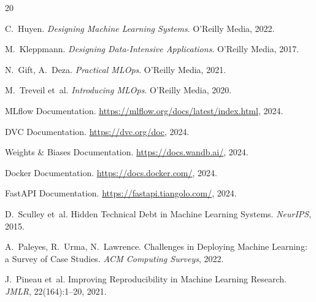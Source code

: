 \documentclass[12pt,a4paper,twoside]{book}
\theoremstyle{definition}
\theoremstyle{plain}
\theoremstyle{remark}
\begin{document}

\begin{thebibliography}{20}

C.~Huyen.
\newblock \emph{Designing Machine Learning Systems}.
\newblock O'Reilly Media, 2022.

M.~Kleppmann.
\newblock \emph{Designing Data-Intensive Applications}.
\newblock O'Reilly Media, 2017.

N.~Gift, A.~Deza.
\newblock \emph{Practical MLOps}.
\newblock O'Reilly Media, 2021.

M.~Treveil et~al.
\newblock \emph{Introducing MLOps}.
\newblock O'Reilly Media, 2020.

MLflow Documentation.
\newblock \url{https://mlflow.org/docs/latest/index.html}, 2024.

DVC Documentation.
\newblock \url{https://dvc.org/doc}, 2024.

Weights \& Biases Documentation.
\newblock \url{https://docs.wandb.ai/}, 2024.

Docker Documentation.
\newblock \url{https://docs.docker.com/}, 2024.

FastAPI Documentation.
\newblock \url{https://fastapi.tiangolo.com/}, 2024.

D.~Sculley et~al.
\newblock Hidden Technical Debt in Machine Learning Systems.
\newblock \emph{NeurIPS}, 2015.

A.~Paleyes, R.~Urma, N.~Lawrence.
\newblock Challenges in Deploying Machine Learning: a Survey of Case Studies.
\newblock \emph{ACM Computing Surveys}, 2022.

J.~Pineau et~al.
\newblock Improving Reproducibility in Machine Learning Research.
\newblock \emph{JMLR}, 22(164):1--20, 2021.

\end{thebibliography}

\printindex
\end{document}
